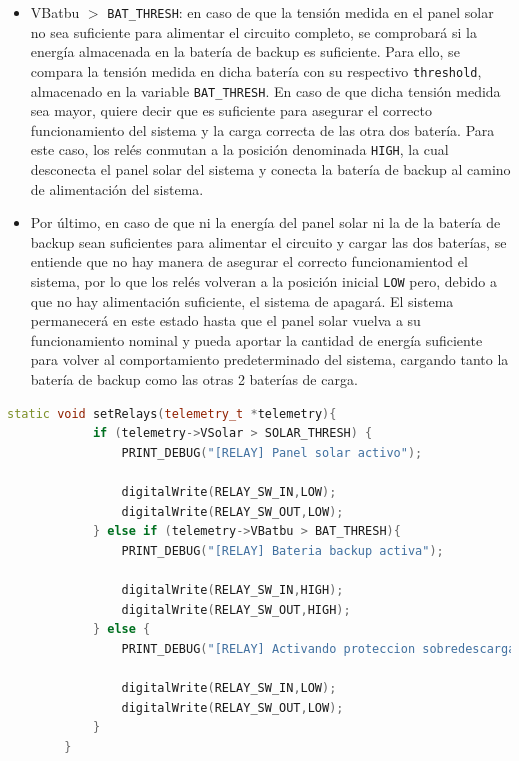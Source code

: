 \begin{itemize}
\begin{itemize}
        \item VBatbu $>$ \texttt{BAT\_THRESH}: en caso de que la tensión medida en el panel solar no sea suficiente para alimentar el circuito completo, se comprobará si la energía almacenada en la batería de backup es suficiente. Para ello, se compara la tensión medida en dicha batería con su respectivo \texttt{threshold}, almacenado en la variable \texttt{BAT\_THRESH}. En caso de que dicha tensión medida sea mayor, quiere decir que es suficiente para asegurar el correcto funcionamiento del sistema y la carga correcta de las otra dos batería. Para este caso, los relés conmutan a la posición denominada \texttt{HIGH}, la cual desconecta el panel solar del sistema y conecta la batería de backup al camino de alimentación del sistema.
        \item Por último, en caso de que ni la energía del panel solar ni la de la batería de backup sean suficientes para alimentar el circuito y cargar las dos baterías, se entiende que no hay manera de asegurar el correcto funcionamientod el sistema, por lo que los relés volveran a la posición inicial \texttt{LOW} pero, debido a que no hay alimentación suficiente, el sistema de apagará. El sistema permanecerá en este estado hasta que el panel solar vuelva a su funcionamiento nominal y pueda aportar la cantidad de energía suficiente para volver al comportamiento predeterminado del sistema, cargando tanto la batería de backup como las otras 2 baterías de carga.
    \end{itemize}
    \begin{lstlisting}[captionpos=b, caption={Desarrollo función setRelays}, language=c++]
        static void setRelays(telemetry_t *telemetry){
            if (telemetry->VSolar > SOLAR_THRESH) {
                PRINT_DEBUG("[RELAY] Panel solar activo");

                digitalWrite(RELAY_SW_IN,LOW);
                digitalWrite(RELAY_SW_OUT,LOW);
            } else if (telemetry->VBatbu > BAT_THRESH){
                PRINT_DEBUG("[RELAY] Bateria backup activa");

                digitalWrite(RELAY_SW_IN,HIGH);
                digitalWrite(RELAY_SW_OUT,HIGH);
            } else {
                PRINT_DEBUG("[RELAY] Activando proteccion sobredescarga. Se detendra el sistema");

                digitalWrite(RELAY_SW_IN,LOW);
                digitalWrite(RELAY_SW_OUT,LOW);
            }
        }
    \end{lstlisting}
\end{itemize}
